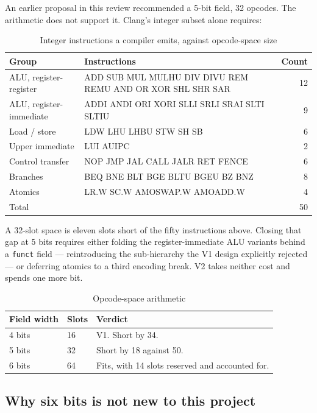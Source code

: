 \documentclass[11pt,a4paper]{article}
\begin{document}
An earlier proposal in this review recommended a 5-bit field, 32 opcodes. The
arithmetic does not support it. Clang's integer subset alone requires:

\begin{table}[htbp]
\centering
\caption{Integer instructions a compiler emits, against opcode-space size}
\begin{tabular}{lp{8.6cm}r}
\toprule
Group & Instructions & Count \\
\midrule
ALU, register-register   & ADD SUB MUL MULHU DIV DIVU REM REMU AND OR XOR SHL SHR SAR & 12 \\
ALU, register-immediate  & ADDI ANDI ORI XORI SLLI SRLI SRAI SLTI SLTIU & 9 \\
Load / store             & LDW LHU LHBU STW SH SB & 6 \\
Upper immediate          & LUI AUIPC & 2 \\
Control transfer         & NOP JMP JAL CALL JALR RET FENCE & 6 \\
Branches                 & BEQ BNE BLT BGE BLTU BGEU BZ BNZ & 8 \\
Atomics                  & LR.W SC.W AMOSWAP.W AMOADD.W & 4 \\
\midrule
Total                    &  & 50 \\
\bottomrule
\end{tabular}
\end{table}

A 32-slot space is eleven slots short of the fifty instructions above. Closing
that gap at 5 bits requires either folding the register-immediate ALU variants
behind a \texttt{funct} field --- reintroducing the sub-hierarchy the V1 design
explicitly rejected --- or deferring atomics to a third encoding break. V2 takes
neither cost and spends one more bit.

\begin{table}[htbp]
\centering
\caption{Opcode-space arithmetic}
\begin{tabular}{lll}
\toprule
Field width & Slots & Verdict \\
\midrule
4 bits & 16 & V1. Short by 34. \\
5 bits & 32 & Short by 18 against 50. \\
6 bits & 64 & Fits, with 14 slots reserved and accounted for. \\
\bottomrule
\end{tabular}
\end{table}

\subsection{Why six bits is not new to this project}
\end{document}
